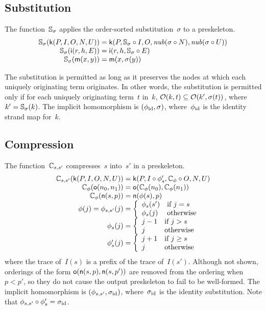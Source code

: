 \documentclass[12pt]{report}
\theoremstyle{definition}
\begin{document}
\subsection{Substitution}

The function~$\mathbb S_\sigma$ applies the order-sorted substitution~$\sigma$
to a preskeleton.
$$
\begin{array}{r@{}c@{}l}
\ops{S}_\sigma(\cn{k}(P, I, O, N, U))&{}={}&
\cn{k}(P, \ops{S}_\sigma\circ I, O, \fn{nub}(\sigma\circ N),
\fn{nub}(\sigma\circ U))\\
\ops{S}_\sigma(\cn{i}(r,h,E))&{}={}&\cn{i}(r, h, \ops{S}_\sigma\circ E)\\
\ops{S}_\sigma(\cn{m}(x,y))&{}={}&\cn{m}(x,\sigma(y))
\end{array}
$$

The substitution is permitted as long as it preserves the nodes at
which each uniquely originating term originates.  In other words, the
substitution is permitted only if for each uniquely originating
term~$t$ in~$k$, $\mathcal{O}(k,t)\subseteq\mathcal{O}(k', \sigma(t))$, where
$k'=\mathbb S_\sigma(k)$.  The implicit homomorphism is
$(\phi_{\mathrm{id}},\sigma)$, where~$\phi_{\mathrm{id}}$ is the identity strand map for~$k$.

\subsection{Compression}

The function~$\mathbb C_{s,s'}$ compresses~$s$ into~$s'$ in a preskeleton.
$$
\begin{array}{r@{}c@{}l}
\ops{C}_{s,s'}(\cn{k}(P, I, O, N, U))&{}={}&
\cn{k}(P, I\circ\phi'_s, \ops{C}_{\phi}\circ O, N, U)\\
\ops{C}_\phi(\cn{o}(n_0, n_1))&{}={}
&\cn{o}(\ops{C}_\phi(n_0), \ops{C}_\phi(n_1))\\
\ops{C}_\phi(\cn{n}(s, p))&{}={}&\cn{n}(\phi(s), p)\\
\phi(j)=\phi_{s,s'}(j)&{}={}&\left\{
\begin{array}{ll}
\phi_s(s')&\mbox{if $j=s$}\\
\phi_s(j)&\mbox{otherwise}
\end{array}\right.\\
\phi_s(j)&{}={}&\left\{
\begin{array}{ll}
j-1&\mbox{if $j>s$}\\
j&\mbox{otherwise}
\end{array}\right.\\
\phi'_s(j)&{}={}&\left\{
\begin{array}{ll}
j+1&\mbox{if $j\geq s$}\\
j&\mbox{otherwise}
\end{array}\right.
\end{array}
$$ where the trace of~$I(s)$ is a prefix of the trace of~$I(s')$.
Although not shown, orderings of the form
$\operatorname{\mathsf{o}}(\operatorname{\mathsf{n}}(s,p),\operatorname{\mathsf{n}}(s,p'))$ are removed from the ordering when
$p<p'$, so they do not cause the output preskeleton to fail to be
well-formed.  The implicit homomorphism is
$(\phi_{s,s'},\sigma_{\mathrm{id}})$, where~$\sigma_{\mathrm{id}}$ is the identity
substitution.  Note that $\phi_{s,s'}\circ\phi'_s=\sigma_{\mathrm{id}}$.
\end{document}
